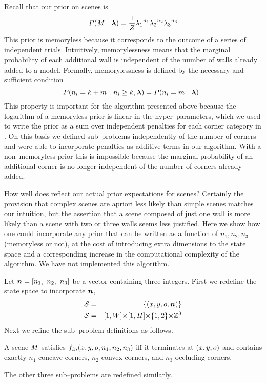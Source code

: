Recall that our prior on scenes  is
\begin{equation}
  \label{eq:scene-prior-2}
  P(\Scene ~|~ \Penalties) = \frac{1}{Z} 
    {\PenaltyConc}^{n_1} {\PenaltyConv}^{n_2} {\PenaltyOccl}^{n_3}
\end{equation}
This prior is memoryless because it corresponds to the outcome of a
series of independent trials. Intuitively, memorylessness means that
the marginal probability of each additional wall is independent of the
number of walls already added to a model. Formally, memorylessness is
defined by the necessary and sufficient condition
\begin{equation}
  P(n_i = k+m ~|~ n_i \geq k, \Penalties) = P(n_i = m ~|~ \Penalties) ~.
\end{equation}
This property is important for the algorithm presented above because
the logarithm of a memoryless prior is linear in the
hyper--parameters, which we used to write the prior as a sum over
independent penalties for each corner category in
. On this basis we defined sub--problems
independently of the number of corners and were able to incorporate
penalties as additive terms in our algorithm. With a
non--memoryless prior this is impossible because the marginal
probability of an additional corner is no longer independent of the
number of corners already added.

How well does  reflect our actual prior
expectations for scenes? Certainly the provision that complex scenes
are apriori less likely than simple scenes matches our intuition, but
the assertion that a scene composed of just one wall is more likely
than a scene with two or three walls seems less justified. Here we
show how one could incorporate any prior that can be written as a
function of $n_1,n_2,n_3$ (memoryless or not), at the cost of
introducing extra dimensions to the state space and a corresponding
increase in the computational complexity of the algorithm. We have not
implemented this algorithm.

Let $\Counts=[n_1,~n_2,~n_3]$ be a vector containing three
integers. First we redefine the state space to incorporate $\Counts$,
\begin{eqnarray}
  \StateSpace &=& \{(x,y,\WallOrient,\Counts)\}\\
  \StateSpace &=& [1,\Width] \cross [1,\Height] \cross \{1,2\} \cross \Ints^3
\end{eqnarray}
Next we refine the sub--problem definitions as follows. 
\begin{definition}
  A scene $\Scene$ satisfies $\SubProbIN(x,y,\WallOrient,n_1,n_2,n_3)$
  iff it terminates at $(x,y,\WallOrient)$ and contains exactly $n_1$
  concave corners, $n_2$ convex corners, and $n_3$ occluding
  corners.
\end{definition}
The other three sub--problems are redefined similarly.

